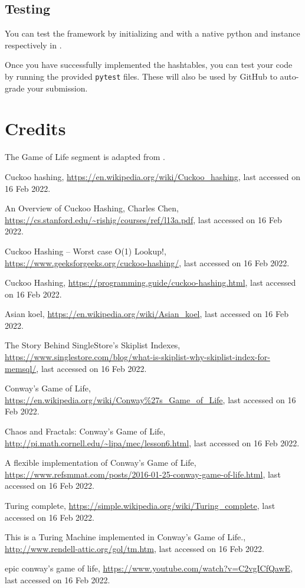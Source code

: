\documentclass[addpoints]{exam}
\begin{document}
\subsection{Testing}

You can test the framework by initializing  and  with a native python  and  instance respectively in .

Once you have successfully implemented the hashtables, you can test your code by running the provided \texttt{pytest} files. These will also be used by GitHub to auto-grade your submission.
  
\section{Credits}

The Game of Life segment is adapted from \cite{gol_impl}.

\newpage
\begin{thebibliography}{9}

Cuckoo hashing, \url{https://en.wikipedia.org/wiki/Cuckoo_hashing}, last accessed on 16 Feb 2022.

An Overview of Cuckoo Hashing, Charles Chen, \url{https://cs.stanford.edu/~rishig/courses/ref/l13a.pdf}, last accessed on 16 Feb 2022.

Cuckoo Hashing – Worst case O(1) Lookup!, \url{https://www.geeksforgeeks.org/cuckoo-hashing/}, last accessed on 16 Feb 2022.

Cuckoo Hashing, \url{https://programming.guide/cuckoo-hashing.html}, last accessed on 16 Feb 2022.

Asian koel, \url{https://en.wikipedia.org/wiki/Asian_koel}, last accessed on 16 Feb 2022.

The Story Behind SingleStore’s Skiplist Indexes, \url{https://www.singlestore.com/blog/what-is-skiplist-why-skiplist-index-for-memsql/}, last accessed on 16 Feb 2022.

  Conway’s Game of Life, \url{https://en.wikipedia.org/wiki/Conway%27s_Game_of_Life}, last accessed on 16 Feb 2022.

  Chaos and Fractals: Conway’s Game of Life, \url{http://pi.math.cornell.edu/~lipa/mec/lesson6.html}, last accessed on 16 Feb 2022.
  
A flexible implementation of Conway's Game of Life, \url{https://www.refsmmat.com/posts/2016-01-25-conway-game-of-life.html}, last accessed on 16 Feb 2022.

Turing complete, \url{https://simple.wikipedia.org/wiki/Turing_complete}, last accessed on 16 Feb 2022.

  This is a Turing Machine implemented in Conway's Game of Life., \url{http://www.rendell-attic.org/gol/tm.htm}, last accessed on 16 Feb 2022.

epic conway's game of life, \url{https://www.youtube.com/watch?v=C2vgICfQawE}, last accessed on 16 Feb 2022.
\end{thebibliography}
\end{document}
